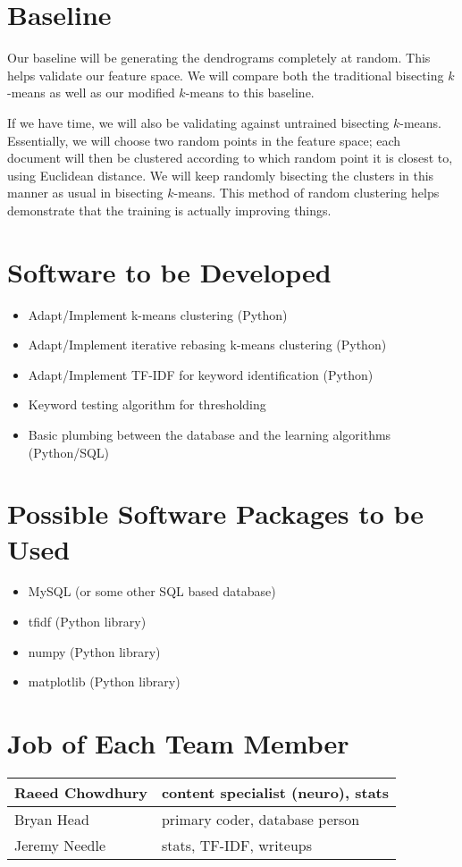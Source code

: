 \documentclass{acm_proc_article-sp}
\begin{document}
\section{Baseline}
Our baseline will be generating the dendrograms completely at random. This helps validate our feature space. We will compare both the traditional bisecting $k$-means as well as our modified $k$-means to this baseline.

If we have time, we will also be validating against untrained bisecting $k$-means. Essentially,  we will choose two random points in the feature space; each document will then be clustered according to which random point it is closest to, using Euclidean distance. We will keep randomly bisecting the clusters in this manner as usual in bisecting $k$-means. This method of random clustering helps demonstrate that the training is actually improving things.

\section{Software to be Developed}
\begin{itemize}
	\item Adapt/Implement k-means clustering (Python)
	\item Adapt/Implement iterative rebasing k-means clustering (Python)
	\item Adapt/Implement TF-IDF for keyword identification (Python)
	\item Keyword testing algorithm for thresholding
	\item Basic plumbing between the database and the learning algorithms (Python/SQL)
\end{itemize}

\section{Possible Software Packages to be Used}
\begin{itemize}
	\item MySQL (or some other SQL based database)
	\item tfidf (Python library)
	\item numpy (Python library)
	\item matplotlib (Python library)
\end{itemize}

\section{Job of Each Team Member}
\begin{tabular}{|l|l|}
	\hline
	Raeed Chowdhury & content specialist (neuro), stats\\
	\hline
	Bryan Head & primary coder, database person\\
	\hline
	Jeremy Needle & stats, TF-IDF, writeups\\
	\hline
\end{tabular}
\end{document}
